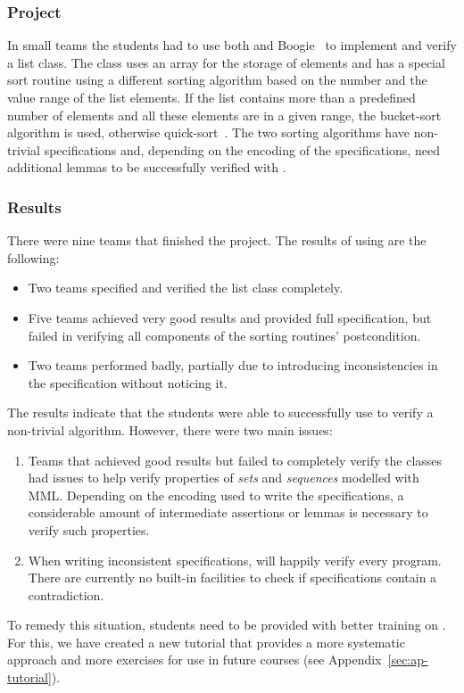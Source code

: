 \subsubsection{Project}

In small teams the students had to use both \AutoProof and Boogie~\cite{LEINO08} to implement and verify a list class. The class uses an array for the storage of elements and has a special sort routine using a different sorting algorithm based on the number and the value range of the list elements. If the list contains more than a predefined number of elements and all these elements are in a given range, the bucket-sort algorithm is used, otherwise quick-sort~\cite{CORMEN09}. The two sorting algorithms have non-trivial specifications and, depending on the encoding of the specifications, need additional lemmas to be successfully verified with \AutoProof.


\subsubsection{Results}

There were nine teams that finished the project.
The results of using \AutoProof are the following:
\begin{itemize}
\item Two teams specified and verified the list class completely.
\item Five teams achieved very good results and provided full specification, but failed in verifying all components of the sorting routines' postcondition.
\item Two teams performed badly, partially due to introducing inconsistencies in the specification without noticing it.
\end{itemize}

The results indicate that the students were able to successfully use \AutoProof to verify a non-trivial algorithm.
However, there were two main issues:
\begin{enumerate}
\item
Teams that achieved good results but failed to completely verify the classes had issues to help \AutoProof verify properties of \emph{sets} and \emph{sequences}  modelled with MML. Depending on the encoding used to write the specifications, a considerable amount of intermediate assertions or lemmas is necessary to verify such properties.

\item
When writing inconsistent specifications, \AutoProof will happily verify every program. There are currently no built-in facilities to check if specifications contain a contradiction.
\end{enumerate}

To remedy this situation, students need to be provided with better training on \AutoProof.
For this, we have created a new tutorial that provides a more systematic approach and more exercises for use in future courses (see Appendix~\ref{sec:ap-tutorial}).

